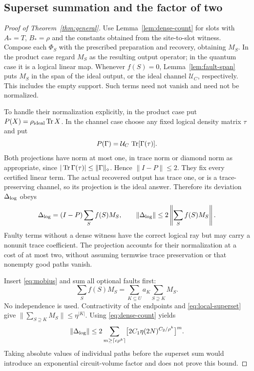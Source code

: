 \subsection{Superset summation and the factor of two}
\begin{proof}[Proof of Theorem~\ref{thm:general}]
Use Lemma~\ref{lem:dense-count} for slots with $A_*=T$, $B_*=\rho$ and the constants obtained from the site-to-slot witness. Compose each $\Phi_S$ with the prescribed preparation and recovery, obtaining $M_S$. In the product case regard $M_S$ as the resulting output operator; in the quantum case it is a logical linear map. Whenever $f(S)=0$, Lemma~\ref{lem:fault-span} puts $M_S$ in the span of the ideal output, or the ideal channel $\mathcal U_C$, respectively. This includes the empty support. Such terms need not vanish and need not be normalized.

To handle their normalization explicitly, in the product case put $P(X)=\rho_{\rm ideal}\operatorname{Tr} X$. In the channel case choose any fixed logical density matrix $\tau$ and put
\[
 P(\Gamma)=\mathcal U_C\,\operatorname{Tr}[\Gamma(\tau)].
\]
Both projections have norm at most one, in trace norm or diamond norm as appropriate, since $|\operatorname{Tr}\Gamma(\tau)|\le\|\Gamma\|_\diamond$. Hence $\|I-P\|\le2$. They fix every certified linear term. The actual recovered output has trace one, or is a trace-preserving channel, so its projection is the ideal answer. Therefore its deviation $\Delta_{\rm log}$ obeys
\begin{equation}\label{eq:factor-two}
 \Delta_{\rm log}
 =(I-P)\sum_S f(S)M_S,\qquad
 \|\Delta_{\rm log}\|\le2\left\|\sum_S f(S)M_S\right\|.
\end{equation}
Faulty terms without a dense witness have the correct logical ray but may carry a nonunit trace coefficient. The projection accounts for their normalization at a cost of at most two, without assuming termwise trace preservation or that nonempty good paths vanish.

Insert \eqref{eq:mobius} and sum all optional faults first:
\[
 \sum_S f(S)M_S
 =\sum_{K\subseteq U}a_K\sum_{S\supseteq K}M_S.
\]
No independence is used. Contractivity of the endpoints and \eqref{eq:local-superset} give $\|\sum_{S\supseteq K}M_S\|\le\eta^{|K|}$. Using \eqref{eq:dense-count} yields
\begin{equation}\label{eq:coherent-series}
 \|\Delta_{\rm log}\|\le
 2\sum_{m\ge\lceil c\rho^k\rceil}
 \bigl[2C_1\eta(2N)^{C_2/\rho^k}\bigr]^m.
\end{equation}
Taking absolute values of individual paths before the superset sum would introduce an exponential circuit-volume factor and does not prove this bound.


\end{proof}
